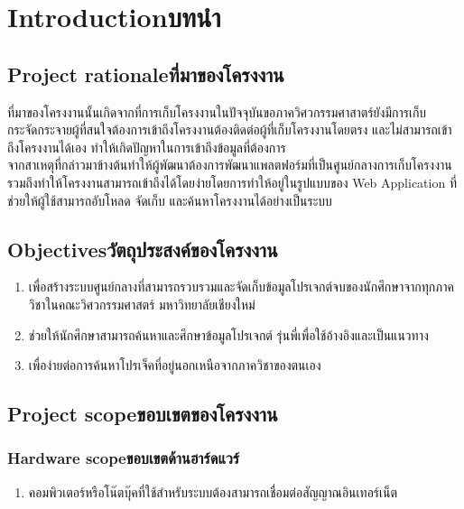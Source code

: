 \chapter{\ifenglish Introduction\else บทนำ\fi}

\section{\ifenglish Project rationale\else ที่มาของโครงงาน\fi}
\raggedright \hspace{1.27cm}ที่มาของโครงงานนั้นเกิดจากที่การเก็บโครงงานในปัจจุบันขอภาควิศวกรรมศาสาตร์ยังมีการเก็บกระจัดกระจายผู้ที่สนใจต้องการเข้าถึงโครงงานต้องติดต่อผู้ที่เก็บโครงงานโดยตรง และไม่สามารถเข้าถึงโครงงานได้เอง ทำให้เกิดปัญหาในการเข้าถึงข้อมูลที่ต้องการ \\

\hspace{1.27cm}จากสาเหตุที่กล่าวมาข้างต้นทำให้ผู้พัฒนาต้องการพัฒนาแพลตฟอร์มที่เป็นศูนย์กลางการเก็บโครงงานรวมถึงทำให้โครงงานสามารถเข้าถึงได้โดยง่ายโดยการทำให้อยู่ในรูปแบบของ Web Application ที่ช่วยให้ผู้ใช้สามารถอับโหลด จัดเก็บ และค้นหาโครงงานได้อย่างเป็นระบบ

\section{\ifenglish Objectives\else วัตถุประสงค์ของโครงงาน\fi}
\begin{enumerate}
    \item เพื่อสร้างระบบศูนย์กลางที่สามารถรวบรวมและจัดเก็บข้อมูลโปรเจกต์จบของนักศึกษาจากทุกภาควิชาในคณะวิศวกรรมศาสตร์ มหาวิทยาลัยเชียงใหม่
    \item ช่วยให้นักศึกษาสามารถค้นหาและศึกษาข้อมูลโปรเจกต์
    รุ่นพี่เพื่อใช้อ้างอิงและเป็นแนวทาง
    \item เพื่อง่ายต่อการค้นหาโปรเจ็คที่อยู่นอกเหนือจากภาควิชาของตนเอง
\end{enumerate}

\section{\ifenglish Project scope\else ขอบเขตของโครงงาน\fi}

\subsection{\ifenglish Hardware scope\else ขอบเขตด้านฮาร์ดแวร์\fi}
\begin{enumerate}
  \item คอมพิวเตอร์หรือโน๊ตบุ๊คที่ใช้สำหรับระบบต้องสามารถเชื่อมต่อสัญญาณอินเทอร์เน็ต 

\end{enumerate}

